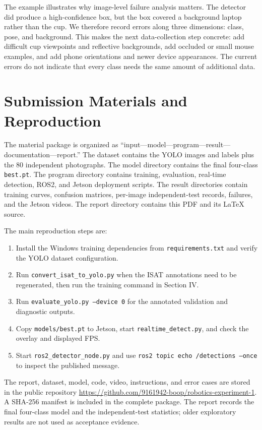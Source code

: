 \documentclass[11pt,conference,a4paper]{IEEEtran}
\newcommand{\code}[1]{\texttt{\footnotesize #1}}
\begin{document}
The example illustrates why image-level failure analysis matters. The detector did produce a high-confidence box, but the box covered a background laptop rather than the cup. We therefore record errors along three dimensions: class, pose, and background. This makes the next data-collection step concrete: add difficult cup viewpoints and reflective backgrounds, add occluded or small mouse examples, and add phone orientations and newer device appearances. The current errors do not indicate that every class needs the same amount of additional data.

\section{Submission Materials and Reproduction}
The material package is organized as “input—model—program—result—documentation—report.” The dataset contains the YOLO images and labels plus the 80 independent photographs. The model directory contains the final four-class \code{best.pt}. The program directory contains training, evaluation, real-time detection, ROS2, and Jetson deployment scripts. The result directories contain training curves, confusion matrices, per-image independent-test records, failures, and the Jetson videos. The report directory contains this PDF and its LaTeX source.

The main reproduction steps are:
\begin{enumerate}
\item Install the Windows training dependencies from \code{requirements.txt} and verify the YOLO dataset configuration.
\item Run \code{convert\_isat\_to\_yolo.py} when the ISAT annotations need to be regenerated, then run the training command in Section IV.
\item Run \code{evaluate\_yolo.py --device 0} for the annotated validation and diagnostic outputs.
\item Copy \code{models/best.pt} to Jetson, start \code{realtime\_detect.py}, and check the overlay and displayed FPS.
\item Start \code{ros2\_detector\_node.py} and use \code{ros2 topic echo /detections --once} to inspect the published message.
\end{enumerate}

The report, dataset, model, code, video, instructions, and error cases are stored in the public repository \url{https://github.com/9161942-boop/robotics-experiment-1}. A SHA-256 manifest is included in the complete package. The report records the final four-class model and the independent-test statistics; older exploratory results are not used as acceptance evidence.
\end{document}

